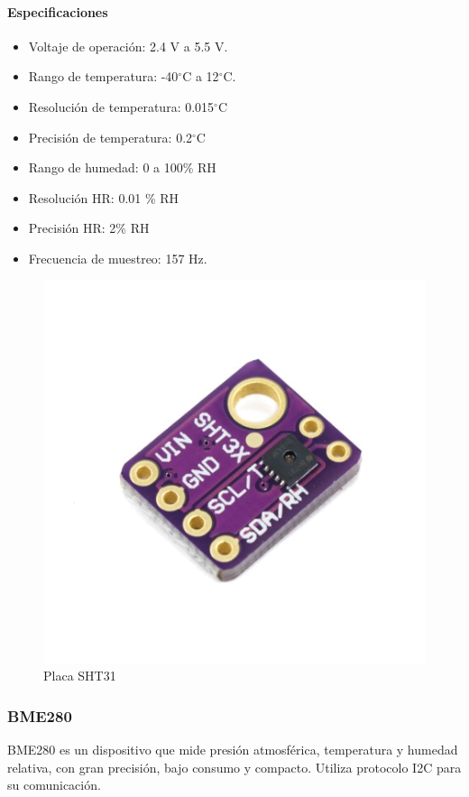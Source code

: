\documentclass[12pt,a4paper]{article}
\newcommand{\grad}{$^{\circ}$}
\begin{document}
	\paragraph*{Especificaciones}
	\begin{itemize}
		\item   Voltaje de operación: 2.4 V a 5.5 V.
		\item	Rango de temperatura: -40\grad C a 12\grad C.
		\item   Resolución de temperatura: 0.015\grad C
		\item	Precisión de temperatura: 0.2\grad C 
		\item	Rango de humedad: 0 a 100\% RH
		\item   Resolución HR: 0.01 \% RH
		\item   Precisión HR: 2\% RH
		\item Frecuencia de muestreo: 157 Hz.
	\end{itemize}
		\begin{figure}[htb]
	\centering
	\includegraphics[scale=0.35]{SHT31.png}
	\caption{Placa SHT31}
	\label{fig:SHT31}
		\end{figure}
	
	\subsubsection{BME280}
	BME280 es un dispositivo que mide presión atmosférica, temperatura y humedad relativa, con gran precisión, bajo consumo y compacto. Utiliza protocolo I2C para su comunicación.
\end{document}
